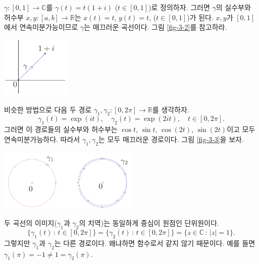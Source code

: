 \begin{saltexample}[label=example-3-1]{}{}
$\gamma : [0,1] \to \mathbb C$를 
$\gamma(t) = t(1+i)$ ($t\in[0,1]$)로 정의하자.
그러면 $\gamma$의 실수부와 허수부  $x,y: [a,b] \to \mathbb R$는
$x(t)=t$, $y(t)=t$, ($t\in [0,1]$)가 된다.
$x, y$가 $[0,1]$에서 연속미분가능이므로 $\gamma$는 매끄러운 곡선이다.
그림 \ref{fig-3-2}를 참고하라.
\begin{center}
\includegraphics[width=0.25\textwidth]{./SaltChapter/figs/fig-3-2}
\end{center}
\label{fig-3-2}
\saltfigskip

비슷한 방법으로 다음 두 경로  $\gamma_1, \gamma_2: [0,2\pi] \to \mathbb R$를
생각하자.
\[
\gamma_1(t) = \exp(it), \quad \gamma_2(t) = \exp(2it), \quad t\in [0,2\pi].
\]
그러면 이 경로들의 실수부와 허수부는
$\cos t$, $\sin t$, $\cos(2t)$, $\sin(2t)$이고
모두 연속미분가능하다.
따라서 $\gamma_1, \gamma_2$는 모두 매끄러운 경로이다.
그림 \ref{fig-3-3}을 보자.
\begin{center}
\includegraphics[width=0.5\textwidth]{./SaltChapter/figs/fig-3-3}
\end{center}
\label{fig-3-3}
\saltfigskip
두 곡선의 이미지($\gamma_1$과 $\gamma_2$의 치역)는 동일하게
중심이 원점인 단위원이다.
\[
\{\gamma_1(t) \,:\, t\in[0,2\pi]\}  
= \{\gamma_2(t) \,:\, t\in[0,2\pi]\}  
= \{z\in\mathbb C \,:\, |z|=1 \}. 
\] 
그렇지만 $\gamma_1$과 $\gamma_2$는 다른 경로이다.
왜냐하면 함수로서 같지 않기 때문이다. 예를 들면
$\gamma_1(\pi) = -1 \ne 1 = \gamma_2(\pi)$.
\end{saltexample}

